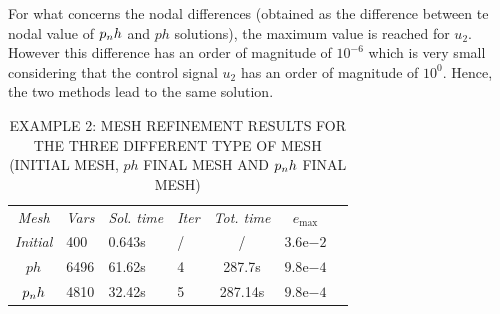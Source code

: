 For what concerns the nodal differences (obtained as the difference between te nodal value of $p_{n}h$ and $ph$ solutions), the maximum value is reached for $u_2$. However this difference has an order of magnitude of $10^{-6}$ which is very small considering that the control signal $u_2$ has an order of magnitude of $10^0$. Hence, the two methods lead to the same solution.
\begin{table}[t]
	\caption{EXAMPLE 2: MESH REFINEMENT RESULTS FOR THE THREE DIFFERENT TYPE OF MESH (INITIAL MESH, $ph$ FINAL MESH AND $p_{n}h$ FINAL MESH)}
	\begin{center}
		\label{tab:tabledisk}
		\begin{tabular}{c l l l c c c}
			& & \\ %
			\hline
			\emph{Mesh} & \emph{Vars} & \emph{Sol. time} & \emph{Iter} & \emph{Tot. time} & $e_\text{max}$ \\
			\hline
			\emph{Initial} & 400 & 0.643s & / & / &  $3.6\mathrm{e}{-2}$\\
			$ph$  & 6496 & 61.62s & 4 & 287.7s & $9.8\mathrm{e}{-4}$ \\
			$p_{n}h$ & 4810 & 32.42s & 5 & 287.14s & $9.8\mathrm{e}{-4}$ \\
			\hline
		\end{tabular}
	\end{center}
\end{table}
